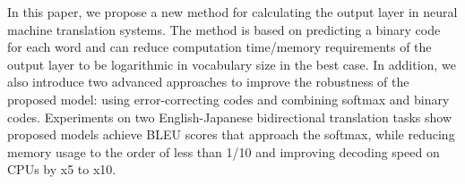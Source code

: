 In this paper, we propose a new method for calculating the output layer in neural machine translation systems. The method is based on predicting a binary code for each word and can reduce computation time/memory requirements of the output layer to be logarithmic in vocabulary size in the best case. In addition, we also introduce two advanced approaches to improve the robustness of the proposed model: using error-correcting codes and combining softmax and binary codes. Experiments on two English-Japanese bidirectional translation tasks show proposed models achieve BLEU scores that approach the softmax, while reducing memory usage to the order of less than 1/10 and improving decoding speed on CPUs by x5 to x10.
